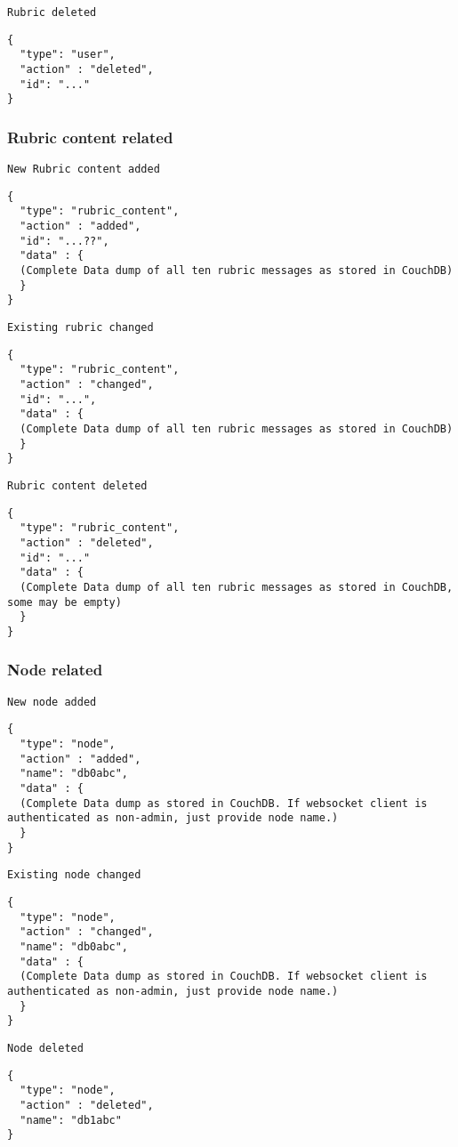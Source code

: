 \texttt{Rubric deleted}
\begin{lstlisting}
{
  "type": "user",
  "action" : "deleted",
  "id": "..."
}
\end{lstlisting}

\subsubsection{Rubric content related}

\texttt{New Rubric content added}
\begin{lstlisting}
{
  "type": "rubric_content",
  "action" : "added",
  "id": "...??",
  "data" : {
  (Complete Data dump of all ten rubric messages as stored in CouchDB)
  }
}
\end{lstlisting}

\texttt{Existing rubric changed}
\begin{lstlisting}
{
  "type": "rubric_content",
  "action" : "changed",
  "id": "...",
  "data" : {
  (Complete Data dump of all ten rubric messages as stored in CouchDB)
  }
}
\end{lstlisting}

\texttt{Rubric content deleted}
\begin{lstlisting}
{
  "type": "rubric_content",
  "action" : "deleted",
  "id": "..."
  "data" : {
  (Complete Data dump of all ten rubric messages as stored in CouchDB, some may be empty)
  }
}
\end{lstlisting}


\subsubsection{Node related}
\texttt{New node added}
\begin{lstlisting}
{
  "type": "node",
  "action" : "added",
  "name": "db0abc",
  "data" : {
  (Complete Data dump as stored in CouchDB. If websocket client is authenticated as non-admin, just provide node name.)
  }
}
\end{lstlisting}

\texttt{Existing node changed}
\begin{lstlisting}
{
  "type": "node",
  "action" : "changed",
  "name": "db0abc",
  "data" : {
  (Complete Data dump as stored in CouchDB. If websocket client is authenticated as non-admin, just provide node name.)
  }
}
\end{lstlisting}

\texttt{Node deleted}
\begin{lstlisting}
{
  "type": "node",
  "action" : "deleted",
  "name": "db1abc"
}
\end{lstlisting}


